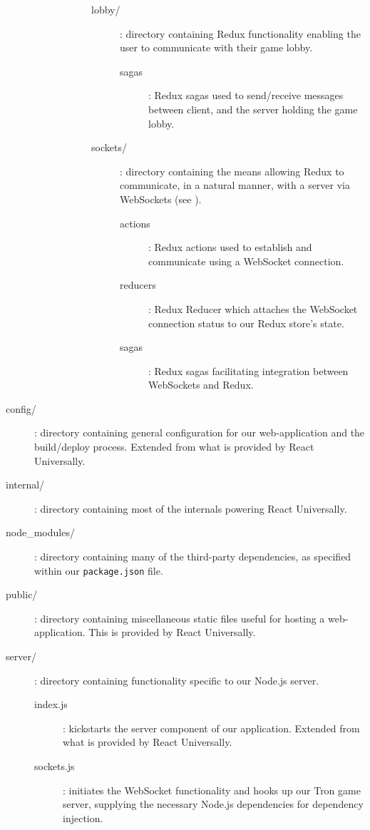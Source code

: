 \documentclass{standalone}
\begin{document}
\begin{formal}
\begin{description}
\begin{description}
\begin{description}
\begin{description}
			        	\item[lobby/]: directory containing Redux functionality enabling the user to communicate with their game lobby.
		      			\begin{description}
			        		\item[sagas]: Redux sagas used to send/receive messages between client, and the server holding the game lobby.
		      			\end{description}

			        	\item[sockets/]: directory containing the means allowing Redux to communicate, in a natural manner, with a server via WebSockets (see ).
		      			\begin{description}
				        	\item[actions]: Redux actions used to establish and communicate using a WebSocket connection.
				        	\item[reducers]: Redux Reducer which attaches the WebSocket connection status to our Redux store's state.
				        	\item[sagas]: Redux sagas facilitating integration between WebSockets and Redux. 
		      			\end{description}
		      		\end{description}
	      		\end{description}
	      	\end{description}

	        \item[config/]: directory containing general configuration for our web-application and the build/deploy process. Extended from what is provided by React Universally.

	        \item[internal/]: directory containing most of the internals powering React Universally.

	      	\item[node\_modules/]: directory containing many of the third-party dependencies, as specified within our \texttt{package.json} file.

	      	\item[public/]: directory containing miscellaneous static files useful for hosting a web-application. This is provided by React Universally.

	      	\item[server/]: directory containing functionality specific to our Node.js server.
		        \begin{description}
		        	\item[index.js]: kickstarts the server component of our application. Extended from what is provided by React Universally.
		        	\item[sockets.js]: initiates the WebSocket functionality and hooks up our Tron game server, supplying the necessary Node.js dependencies for dependency injection.


\end{description}
\end{description}
\end{formal}
\end{document}
